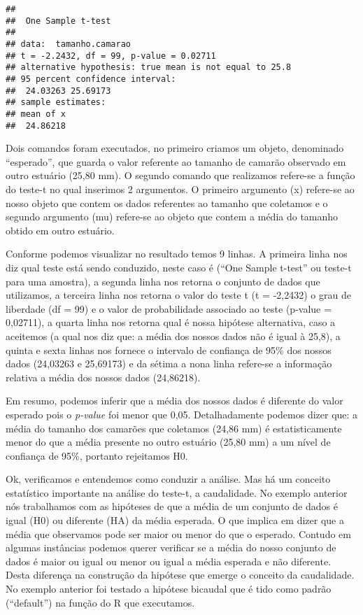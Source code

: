 \documentclass[14pt,titlepage, oneside, openany, a4paper]{book}
\begin{document}
\begin{verbatim}
## 
##  One Sample t-test
## 
## data:  tamanho.camarao
## t = -2.2432, df = 99, p-value = 0.02711
## alternative hypothesis: true mean is not equal to 25.8
## 95 percent confidence interval:
##  24.03263 25.69173
## sample estimates:
## mean of x 
##  24.86218
\end{verbatim}

Dois comandos foram executados, no primeiro criamos um objeto, denominado ``esperado'', que guarda o valor referente ao tamanho de camarão observado em outro estuário (25,80 mm). O segundo comando que realizamos refere-se a função do teste-t no qual inserimos 2 argumentos. O primeiro argumento (x) refere-se ao nosso objeto que contem os dados referentes ao tamanho que coletamos e o segundo argumento (mu) refere-se ao objeto que contem a média do tamanho obtido em outro estuário.

Conforme podemos visualizar no resultado temos 9 linhas. A primeira linha nos diz qual teste está sendo conduzido, neste caso é (``One Sample t-test'' ou teste-t para uma amostra), a segunda linha nos retorna o conjunto de dados que utilizamos, a terceira linha nos retorna o valor do teste t (t = -2,2432) o grau de liberdade (df = 99) e o valor de probabilidade associado ao teste (p-value = 0,02711), a quarta linha nos retorna qual é nossa hipótese alternativa, caso a aceitemos (a qual nos diz que: a média dos nossos dados não é igual à 25,8), a quinta e sexta linhas nos fornece o intervalo de confiança de 95\% dos nossos dados (24,03263 e 25,69173) e da sétima a nona linha refere-se a informação relativa a média dos nossos dados (24,86218).

Em resumo, podemos inferir que a média dos nossos dados é diferente do valor esperado pois o \emph{p-value} foi menor que 0,05. Detalhadamente podemos dizer que: a média do tamanho dos camarões que coletamos (24,86 mm) é estatisticamente menor do que a média presente no outro estuário (25,80 mm) a um nível de confiança de 95\%, portanto rejeitamos H0.

Ok, verificamos e entendemos como conduzir a análise. Mas há um conceito estatístico importante na análise do teste-t, a caudalidade. No exemplo anterior nós trabalhamos com as hipóteses de que a média de um conjunto de dados é igual (H0) ou diferente (HA) da média esperada. O que implica em dizer que a média que observamos pode ser maior ou menor do que o esperado. Contudo em algumas instâncias podemos querer verificar se a média do nosso conjunto de dados é maior ou igual ou menor ou igual a média esperada e não diferente. Desta diferença na construção da hipótese que emerge o conceito da caudalidade. No exemplo anterior foi testado a hipótese bicaudal que é tido como padrão (``default'') na função do R que executamos.
\end{document}
